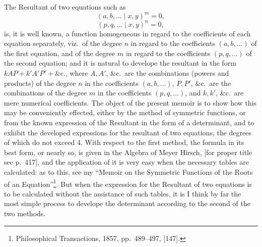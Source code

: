 \documentclass[11pt]{article}
\begin{document}
\medskip

\noindent The Resultant of two equations such as
\[
(a, b, \ldots \mid x, y)^m = 0,
\]
\[
(p, q, \ldots \mid x, y)^n = 0,
\]
is, it is well known, a function homogeneous in regard to the coefficients of each equation separately, viz.\ of the degree $n$ in regard to the coefficients $(a, b, \ldots)$ of the first equation, and of the degree $m$ in regard to the coefficients $(p, q, \ldots)$ of the second equation; and it is natural to develope the resultant in the form $kAP + k'A'P' + \&\text{c.}$, where $A, A'$, \&c.\ are the combinations (powers and products) of the degree $n$ in the coefficients $(a, b, \ldots)$, $P, P'$, \&c.\ are the combinations of the degree $m$ in the coefficients $(p, q, \ldots)$, and $k, k'$, \&c.\ are mere numerical coefficients. The object of the present memoir is to show how this may be conveniently effected, either by the method of symmetric functions, or from the known expression of the Resultant in the form of a determinant, and to exhibit the developed expressions for the resultant of two equations, the degrees of which do not exceed 4. With respect to the first method, the formula in its best form, or nearly so, is given in the Algebra of Meyer Hirsch, [for proper title see p.~417], and the application of it is very easy when the necessary tables are calculated: as to this, see my ``Memoir on the Symmetric Functions of the Roots of an Equation''\footnote{Philosophical Transactions, 1857, pp.~489--497, [147].}. But when the expression for the Resultant of two equations is to be calculated without the assistance of such tables, it is I think by far the most simple process to develope the determinant according to the second of the two methods.

\medskip
\end{document}
